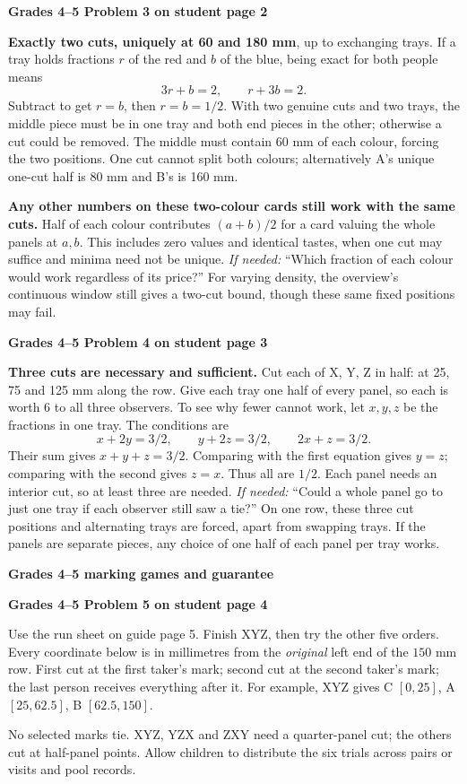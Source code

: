 \documentclass[11pt]{article}
\newcommand{\head}[1]{\par\textbf{\large #1}\par}
\newcommand{\sub}[1]{\par\textbf{#1}\par}
\newcommand{\hint}[1]{\textit{If needed:} #1}
\begin{document}
\sub{Grades 4--5 Problem 3 on student page 2}
\textbf{Exactly two cuts, uniquely at 60 and 180 mm}, up to exchanging trays. If a tray holds fractions $r$ of the red and $b$ of the blue, being exact for both people means
\[
3r+b=2,\qquad r+3b=2.
\]
Subtract to get $r=b$, then $r=b=1/2$. With two genuine cuts and two trays, the middle piece must be in one tray and both end pieces in the other; otherwise a cut could be removed. The middle must contain 60 mm of each colour, forcing the two positions. One cut cannot split both colours; alternatively A's unique one-cut half is 80 mm and B's is 160 mm.

\textbf{Any other numbers on these two-colour cards still work with the same cuts.} Half of each colour contributes $(a+b)/2$ for a card valuing the whole panels at $a,b$. This includes zero values and identical tastes, when one cut may suffice and minima need not be unique. \hint{``Which fraction of each colour would work regardless of its price?''} For varying density, the overview's continuous window still gives a two-cut bound, though these same fixed positions may fail.

\sub{Grades 4--5 Problem 4 on student page 3}
\textbf{Three cuts are necessary and sufficient.} Cut each of X, Y, Z in half: at 25, 75 and 125 mm along the row. Give each tray one half of every panel, so each is worth 6 to all three observers. To see why fewer cannot work, let $x,y,z$ be the fractions in one tray. The conditions are
\[
x+2y=3/2,\qquad y+2z=3/2,\qquad 2x+z=3/2.
\]
Their sum gives $x+y+z=3/2$. Comparing with the first equation gives $y=z$; comparing with the second gives $z=x$. Thus all are $1/2$. Each panel needs an interior cut, so at least three are needed. \hint{``Could a whole panel go to just one tray if each observer still saw a tie?''} On one row, these three cut positions and alternating trays are forced, apart from swapping trays. If the panels are separate pieces, any choice of one half of each panel per tray works.
\newpage
\head{Grades 4--5 marking games and guarantee}
\sub{Grades 4--5 Problem 5 on student page 4}
Use the run sheet on guide page 5. Finish XYZ, then try the other five orders. Every coordinate below is in millimetres from the \emph{original} left end of the $150$ mm row. First cut at the first taker's mark; second cut at the second taker's mark; the last person receives everything after it. For example, XYZ gives C $[0,25]$, A $[25,62.5]$, B $[62.5,150]$.
\begin{center}\small\setlength{\tabcolsep}{4pt}\gametable\end{center}
No selected marks tie. XYZ, YZX and ZXY need a quarter-panel cut; the others cut at half-panel points. Allow children to distribute the six trials across pairs or visits and pool records.
\end{document}
